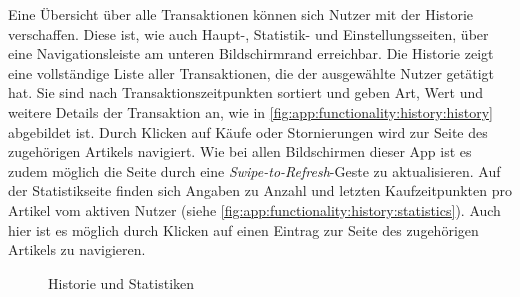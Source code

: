 Eine Übersicht über alle Transaktionen können sich Nutzer mit der Historie verschaffen.
Diese ist, wie auch Haupt-, Statistik- und Einstellungsseiten, über eine Navigationsleiste am unteren Bildschirmrand erreichbar.
Die Historie zeigt eine vollständige Liste aller Transaktionen, die der ausgewählte Nutzer getätigt hat.
Sie sind nach Transaktionszeitpunkten sortiert und geben Art, Wert und weitere Details der Transaktion an, wie in \autoref{fig:app:functionality:history:history} abgebildet ist.
Durch Klicken auf Käufe oder Stornierungen wird zur Seite des zugehörigen Artikels navigiert.
Wie bei allen Bildschirmen dieser App ist es zudem möglich die Seite durch eine \textit{Swipe-to-Refresh}-Geste zu aktualisieren.
Auf der Statistikseite finden sich Angaben zu Anzahl und letzten Kaufzeitpunkten pro Artikel vom aktiven Nutzer (siehe \autoref{fig:app:functionality:history:statistics}).
Auch hier ist es möglich durch Klicken auf einen Eintrag zur Seite des zugehörigen Artikels zu navigieren.
\begin{figure}%
	\centering
	\qquad
	\caption{Historie und Statistiken}%
	\label{fig:app:functionality:history}%
\end{figure}

